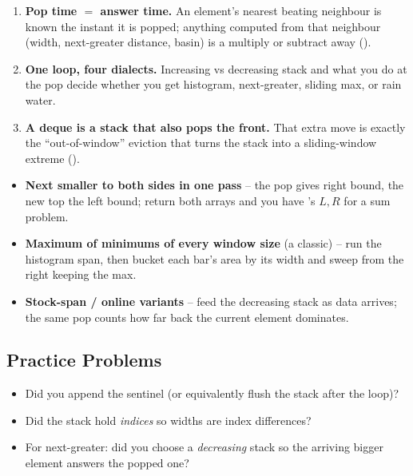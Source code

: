 \begin{insightbox}
\begin{enumerate}[nosep, leftmargin=1.6em]
  \item \textbf{Pop time $=$ answer time.} An element's nearest beating neighbour is known the instant it
        is popped; anything computed from that neighbour (width, next-greater distance, basin) is a
        multiply or subtract away ().
  \item \textbf{One loop, four dialects.} Increasing vs decreasing stack and what you do at the pop
        decide whether you get histogram, next-greater, sliding max, or rain water.
  \item \textbf{A deque is a stack that also pops the front.} That extra move is exactly the
        ``out-of-window'' eviction that turns the stack into a sliding-window extreme
        ().
\end{enumerate}
\end{insightbox}

\begin{hardeningbox}
\begin{itemize}[nosep, leftmargin=1.4em]
  \item \textbf{Next smaller to both sides in one pass} -- the pop gives right bound, the new top the left
        bound; return both arrays and you have 's $L,R$ for a sum problem.
  \item \textbf{Maximum of minimums of every window size} (a classic) -- run the histogram span, then
        bucket each bar's area by its width and sweep from the right keeping the max.
  \item \textbf{Stock-span / online variants} -- feed the decreasing stack as data arrives; the same pop
        counts how far back the current element dominates.
\end{itemize}
\end{hardeningbox}

\subsection{Practice Problems}

\begin{stuckbox}
\begin{itemize}[nosep, leftmargin=1.4em]
  \item Did you append the sentinel (or equivalently flush the stack after the loop)?
  \item Did the stack hold \emph{indices} so widths are index differences?
  \item For next-greater: did you choose a \emph{decreasing} stack so the arriving bigger element answers
        the popped one?
\end{itemize}
\end{stuckbox}

